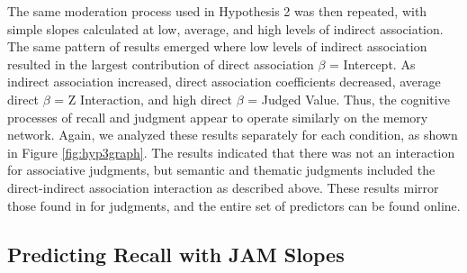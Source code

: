 \documentclass[english,,man]{apa6}
\begin{document}
The same moderation process used in Hypothesis 2 was then repeated, with simple slopes calculated at low, average, and high levels of indirect association. The same pattern of results emerged where low levels of indirect association resulted in the largest contribution of direct association \(\beta\) = Intercept. As indirect association increased, direct association coefficients decreased, average direct \(\beta\) = Z Interaction, and high direct \(\beta\) = Judged Value. Thus, the cognitive processes of recall and judgment appear to operate similarly on the memory network. Again, we analyzed these results separately for each condition, as shown in Figure \ref{fig:hyp3graph}. The results indicated that there was not an interaction for associative judgments, but semantic and thematic judgments included the direct-indirect association interaction as described above. These results mirror those found in for judgments, and the entire set of predictors can be found online.

\hypertarget{predicting-recall-with-jam-slopes}{%
\subsection{Predicting Recall with JAM Slopes}\label{predicting-recall-with-jam-slopes}}
\end{document}
